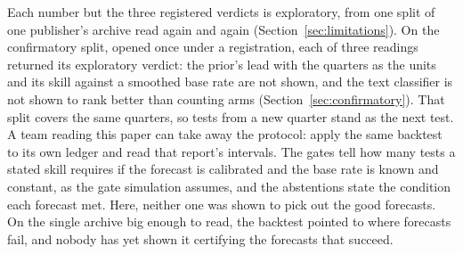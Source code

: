 Each number but the three registered verdicts is exploratory, from one split of one publisher's archive read again and again (Section~\ref{sec:limitations}). On the confirmatory split, opened once under a registration, each of three readings returned its exploratory verdict: the prior's lead with the quarters as the units and its skill against a smoothed base rate are not shown, and the text classifier is not shown to rank better than counting arms (Section~\ref{sec:confirmatory}). That split covers the same quarters, so tests from a new quarter stand as the next test. A team reading this paper can take away the protocol: apply the same backtest to its own ledger and read that report's intervals. The gates tell how many tests a stated skill requires if the forecast is calibrated and the base rate is known and constant, as the gate simulation assumes, and the abstentions state the condition each forecast met. Here, neither one was shown to pick out the good forecasts. On the single archive big enough to read, the backtest pointed to where forecasts fail, and nobody has yet shown it certifying the forecasts that succeed.
